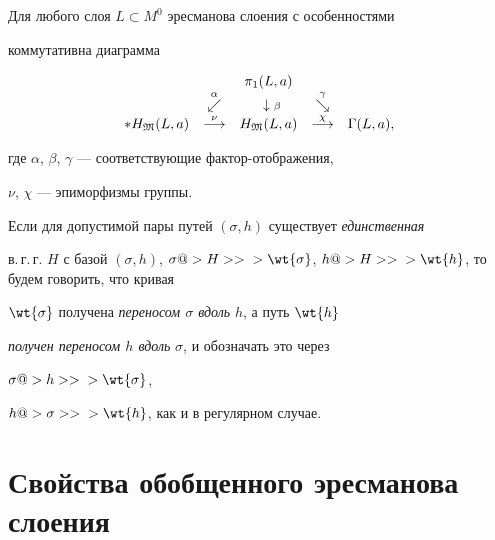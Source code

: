 \begin{cor}\label{coll_diagr}


Для любого слоя $L\subset M^0$ эресманова слоения с особенностями


коммутативна диаграмма


$$\begin{array}{rcccl}


&& \pi_1(L,a) && \\


&\stackrel{\alpha}{\swarrow}&\downarrow\lefteqn{\scriptstyle\beta}&\stackrel{\gamma}{\searrow}&\\


\ast H_{\frak M}(L,a)&\stackrel{\nu}{\longrightarrow}&H_{\frak M}(L,a)&


\stackrel{\chi}{\longrightarrow}&\Gamma(L,a),


\end{array}


$$


где $\alpha$, $\beta$, $\gamma$ --- соответствующие фактор-отображения,


$\nu$, $\chi$ --- эпиморфизмы группы.


\end{cor}





Если для допустимой пары путей $(\sigma, h)$ существует {\it единственная}


в.\,г.\,г. $H$ с базой $(\sigma, h)$, $\sigma@> H>>{}


>\wt{\sigma}$, $h@> H>>{}


>\wt{h}$, то будем говорить, что кривая


$\wt{\sigma}$ получена {\it переносом $\sigma$ вдоль} $h$, а путь $\wt{h}$


{\it получен переносом $h$ вдоль} $\sigma$, и обозначать это через


$\sigma@> h>>{} >\wt{\sigma}$,


$h@> {\sigma}>>{}


>\wt{h}$, как и в регулярном случае.








\section{Свойства обобщенного эресманова слоения}






